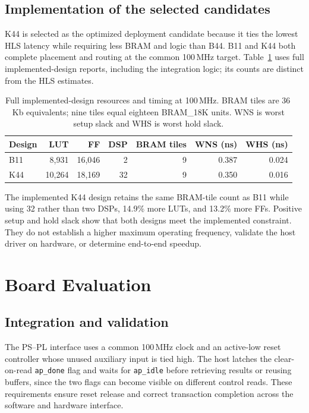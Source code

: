 \documentclass[11pt,letterpaper]{article}
\DeclareRobustCommand{\code}[1]{\nolinkurl{#1}}
\begin{document}
\subsection{Implementation of the selected candidates}
K44 is selected as the optimized deployment candidate because it ties the
lowest HLS latency while requiring less BRAM and logic than B44. B11 and K44
both complete placement and routing at the common 100\,MHz target.
Table~\ref{tab:impl} uses full implemented-design reports, including the
integration logic; its counts are distinct from the HLS estimates.

\begin{table}[tb]
\centering
\small
\caption{Full implemented-design resources and timing at 100\,MHz.
BRAM tiles are 36\,Kb equivalents; nine tiles equal eighteen BRAM\_18K units.
WNS is worst setup slack and WHS is worst hold slack.}
\label{tab:impl}
\begin{tabular}{lrrrrrr}
\toprule
Design & LUT & FF & DSP & BRAM tiles & WNS (ns) & WHS (ns)\\
\midrule
B11 & 8,931 & 16,046 & 2 & 9 & 0.387 & 0.024\\
K44 & 10,264 & 18,169 & 32 & 9 & 0.350 & 0.016\\
\bottomrule
\end{tabular}
\end{table}

The implemented K44 design retains the same BRAM-tile count as B11 while using
32 rather than two DSPs, 14.9\% more LUTs, and 13.2\% more FFs. Positive setup
and hold slack show that both designs meet
the implemented constraint. They do not establish a higher maximum operating
frequency, validate the host driver on hardware, or determine end-to-end speedup.

\section{Board Evaluation}
\label{sec:board}
\subsection{Integration and validation}
The PS--PL interface uses a common 100\,MHz clock and an active-low reset
controller whose unused auxiliary input is tied high. The host latches the
clear-on-read \code{ap_done} flag and waits for \code{ap_idle} before retrieving
results or reusing buffers, since the two flags can become visible on different
control reads. These requirements ensure reset release and correct transaction
completion across the software and hardware interface.
\end{document}
